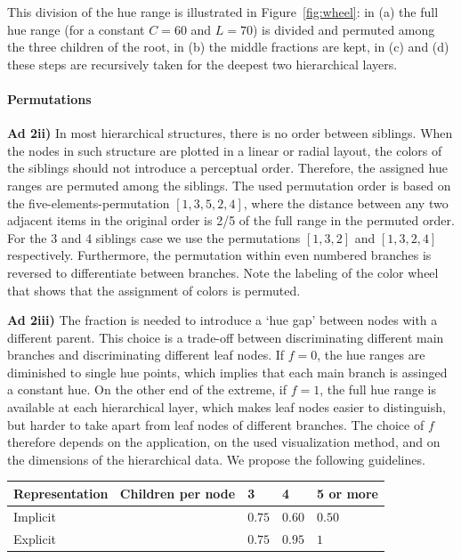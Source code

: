 \documentclass[journal]{vgtc}                %
\begin{document}
This division of the hue range is illustrated in Figure~\ref{fig:wheel}: in (a) the full hue range (for a constant $C=60$ and $L=70$)  is divided and permuted among the three children of the root, in (b) the middle fractions are kept, in (c) and (d) these steps are recursively taken for the deepest two hierarchical layers.

\paragraph{Permutations}

\textbf{Ad 2ii)} In most hierarchical structures, there is no order between siblings. When the nodes in such structure are plotted in a linear or radial layout, the colors of the siblings should not introduce a perceptual order. Therefore, the assigned hue ranges are permuted among the siblings. The used permutation order is based on the five-elements-permutation $[1, 3, 5, 2, 4]$, where the distance between any two adjacent items in the original order is 2/5 of the full range in the permuted order. For the 3 and 4 siblings case we use the permutations $[1, 3, 2]$ and $[1, 3, 2, 4]$ respectively. Furthermore, the permutation within even numbered branches is reversed to differentiate between branches. Note the labeling of the color wheel that shows that the assignment of colors is permuted.


\textbf{Ad 2iii)} The fraction is needed to introduce a `hue gap' between nodes with a different parent. This choice is a trade-off between discriminating different main branches and discriminating different leaf nodes. If $f=0$, the hue ranges are diminished to single hue points, which implies that each main branch is assinged a constant hue. On the other end of the extreme, if $f=1$, the full hue range is available at each hierarchical layer, which makes leaf nodes easier to distinguish, but harder to take apart from leaf nodes of different branches.
The choice of $f$ therefore depends on the application, on the used visualization method, and on the dimensions of the hierarchical data. 
We propose the following guidelines.

\begin{tabular}{llll} 
\toprule 
Representation \ Children per node & 3 & 4 & 5 or more\\ 
\midrule 
Implicit & $0.75$ & $0.60$ & $0.50$ \\ 
Explicit & $0.75$ & $0.95$ & $1$ \\ 
\bottomrule 
\end{tabular}
\end{document}
